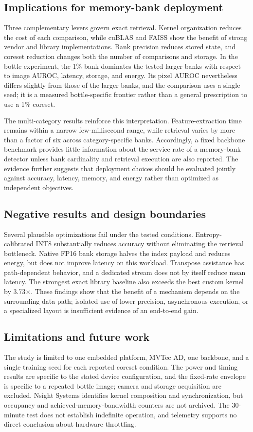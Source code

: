 \documentclass[twocolumn]{svjour3}
\begin{document}
\subsection{Implications for memory-bank deployment}
Three complementary levers govern exact retrieval. Kernel organization reduces
the cost of each comparison, while cuBLAS and FAISS show the benefit of strong
vendor and library implementations. Bank precision reduces stored state, and
coreset reduction changes both the number of comparisons and storage. In the
bottle experiment, the 1\% bank dominates the tested larger banks with respect
to image AUROC, latency, storage, and energy. Its pixel AUROC nevertheless
differs slightly from those of the larger banks, and the comparison uses a
single seed; it is a measured bottle-specific frontier rather than a general
prescription to use a 1\% coreset.

The multi-category results reinforce this interpretation. Feature-extraction
time remains within a narrow few-millisecond range, while retrieval varies by
more than a factor of six across category-specific banks. Accordingly, a fixed
backbone benchmark provides little information about the service rate of a
memory-bank detector unless bank cardinality and retrieval execution are also
reported. The evidence further suggests that deployment choices should be
evaluated jointly against accuracy, latency, memory, and energy rather than
optimized as independent objectives.

\subsection{Negative results and design boundaries}
Several plausible optimizations fail under the tested conditions. Entropy-
calibrated INT8 substantially reduces accuracy without eliminating the
retrieval bottleneck. Native FP16 bank storage halves the index payload and
reduces energy, but does not improve latency on this workload. Transpose
assistance has path-dependent behavior, and a dedicated stream does not by
itself reduce mean latency. The strongest exact library baseline also exceeds
the best custom kernel by 3.73$\times$. These findings show that the benefit of
a mechanism depends on the surrounding data path; isolated use of lower
precision, asynchronous execution, or a specialized layout is insufficient
evidence of an end-to-end gain.

\subsection{Limitations and future work}
The study is limited to one embedded platform, MVTec AD, one backbone, and a
single training seed for each reported coreset condition. The power and timing
results are specific to the stated device configuration, and the fixed-rate
envelope is specific to a repeated bottle image; camera and storage acquisition
are excluded. Nsight Systems identifies kernel composition and synchronization,
but occupancy and achieved-memory-bandwidth counters are not archived. The
30-minute test does not establish indefinite operation, and telemetry supports
no direct conclusion about hardware throttling.
\end{document}
